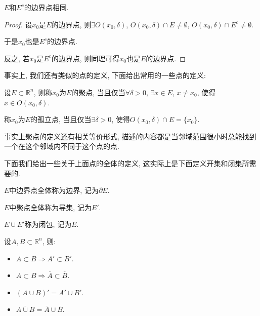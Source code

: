 \documentclass[theorem=false,mathfont=none,openany,sub3section]{easybook}
\begin{document}
\begin{proposition}
  $E$和$E^{c}$的边界点相同.\par
\end{proposition}

\begin{proof}
  设$x_0$是$E$的边界点, 则$\exists O(x_0, \delta)$, $O(x_0,\delta)\cap E \ne \emptyset$, $O(x_0,\delta)\cap E^{c} \ne \emptyset$.\par
  于是$x_0$也是$E^{c}$的边界点.\par
  反之, 若$x_0$是$E^{c}$的边界点, 则同理可得$x_0$也是$E$的边界点.\par
\end{proof}

事实上, 我们还有类似的点的定义, 下面给出常用的一些点的定义:\par

\begin{definition}
  设$E\subset \mathbb{R}^n$, 则称$x_0$为$E$的聚点, 当且仅当$\forall \delta >0$, $\exists x\in E$, $x\ne x_0$, 使得$x\in O(x_0,\delta)$.\par
  称$x_0$为$E$的孤立点, 当且仅当$\exists \delta >0$, 使得$O(x_0,\delta)\cap E=\{x_0\}$.\par
\end{definition}

\begin{remark}
  事实上聚点的定义还有相关等价形式, 描述的内容都是当邻域范围很小时总能找到一个在这个邻域内不同于这个点的点.\par
\end{remark}

下面我们给出一些关于上面点的全体的定义, 这实际上是下面定义开集和闭集所需要的.\par

\begin{definition}
  $E$中边界点全体称为边界, 记为$\partial E$.\par
  $E$中聚点全体称为导集, 记为$E'$.\par
  $E\cup E'$称为闭包, 记为$\overline{E}$.\par
\end{definition}

\begin{theorem}
  设$A,B\subset \mathbb{R}^n$, 则:\par
  \begin{itemize}
    \item $A\subset B \Rightarrow A'\subset B'$.
    \item $A\subset B \Rightarrow \overline{A}\subset \overline{B}$.
    \item $\left(A\cup B\right)'=A'\cup B'$.
    \item $\overline{A\cup B}=\overline{A}\cup \overline{B}$.
  \end{itemize}
\end{theorem}
\end{document}
